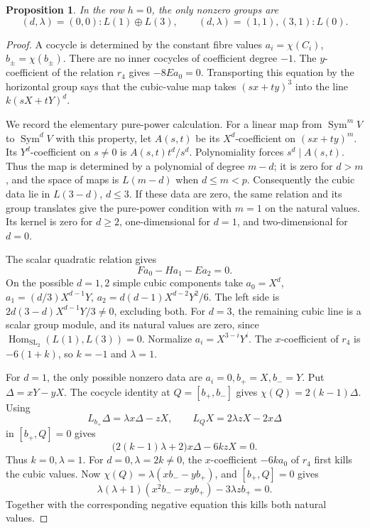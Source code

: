 \documentclass[11pt]{article}
\theoremstyle{plain}
\newtheorem{proposition}[proposition]{Proposition}
\theoremstyle{definition}
\theoremstyle{remark}
\numberwithin{equation}{section}
\newcommand{\kk}{k}
\begin{document}
\begin{proposition}\label{prop:h0-classification}
In the row \(h=0\), the only nonzero groups are
\[
 (d,\lambda)=(0,0):L(1)\oplus L(3),\qquad
 (d,\lambda)=(1,1),(3,1):L(0).
\]
\end{proposition}
\begin{proof}
A cocycle is determined by the constant fibre values
\(a_i=\chi(C_i)\), \(b_\pm=\chi(b_\pm)\).
There are no inner cocycles of coefficient degree \(-1\).
The \(y\)-coefficient of the relation \(r_4\) gives
\(-8Ea_0=0\).
Transporting this equation by the horizontal group says that
the cubic-value map takes
\((sx+ty)^3\) into the line \(\kk(sX+tY)^d\).

We record the elementary pure-power calculation.
For a linear map from \(\operatorname{Sym}^mV\) to
\(\operatorname{Sym}^dV\) with this property, let \(A(s,t)\)
be its \(X^d\)-coefficient on \((sx+ty)^m\).
Its \(Y^d\)-coefficient on \(s\ne0\) is \(A(s,t)t^d/s^d\).
Polynomiality forces \(s^d\mid A(s,t)\).
Thus the map is determined by a polynomial of degree \(m-d\);
it is zero for \(d>m\), and the space of maps is \(L(m-d)\)
when \(d\le m<p\).
Consequently the cubic data lie in \(L(3-d)\), \(d\le3\).
If these data are zero, the same relation and its group translates
give the pure-power condition with \(m=1\) on the natural values.
Its kernel is zero for \(d\ge2\), one-dimensional for \(d=1\),
and two-dimensional for \(d=0\).

The scalar quadratic relation gives
\[
 Fa_0-Ha_1-Ea_2=0.
\]
On the possible \(d=1,2\) simple cubic components take
\(a_0=X^d\), \(a_1=(d/3)X^{d-1}Y\),
\(a_2=d(d-1)X^{d-2}Y^2/6\).
The left side is
\(2d(3-d)X^{d-1}Y/3\ne0\), excluding both.
For \(d=3\), the remaining cubic line is a scalar group module,
and its natural values are zero, since
\(\operatorname{Hom}_{\mathrm{SL}_2}(L(1),L(3))=0\).
Normalize \(a_i=X^{3-i}Y^i\). The \(x\)-coefficient of \(r_4\)
is \(-6(1+k)\), so \(k=-1\) and \(\lambda=1\).

For \(d=1\), the only possible nonzero data are
\(a_i=0,b_+=X,b_-=Y\). Put \(\Delta=xY-yX\).
The cocycle identity at \(Q=[b_+,b_-]\) gives
\(\chi(Q)=2(k-1)\Delta\).
Using
\[
 L_{b_+}\Delta=\lambda x\Delta-zX,\qquad
 L_QX=2\lambda zX-2x\Delta
\]
in \([b_+,Q]=0\) gives
\[
 \bigl(2(k-1)\lambda+2\bigr)x\Delta-6kzX=0 .
\]
Thus \(k=0,\lambda=1\).
For \(d=0,\lambda=2k\ne0\), the \(x\)-coefficient
\(-6ka_0\) of \(r_4\) first kills the cubic values.
Now \(\chi(Q)=\lambda(xb_--yb_+)\), and \([b_+,Q]=0\) gives
\[
 \lambda(\lambda+1)(x^2b_--xyb_+)-3\lambda z b_+=0 .
\]
Together with the corresponding negative equation this kills
both natural values.


\end{proof}
\end{document}
